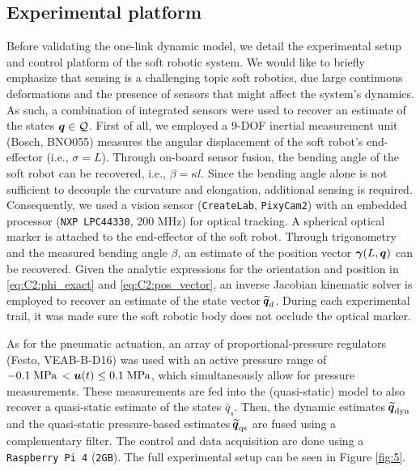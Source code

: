 \subsection{Experimental platform}
\noindent Before validating the one-link dynamic model, we detail the experimental setup and control platform of the soft robotic system. We would like to briefly emphasize that sensing is a challenging topic soft robotics, due large continuous deformations and the presence of sensors that might affect the system's dynamics. As such, a combination of integrated sensors were used to recover an estimate of the states ${\boldsymbol{q}} \in \mathcal{Q}$. First of all, we employed a 9-DOF inertial measurement unit (Bosch, BNO055) measures the angular displacement of the soft robot's end-effector (i.e., $\sigma = L$). Through on-board sensor fusion, the bending angle of the soft robot can be recovered, i.e., $\beta = \kappa l$. Since the bending angle alone is not sufficient to decouple the curvature and elongation, additional sensing is required. Consequently, we used a vision sensor (\texttt{CreateLab}, \texttt{PixyCam2}) with an embedded processor (\texttt{NXP LPC44330}, 200 MHz) for optical tracking. A spherical optical marker is attached to the end-effector of the soft robot. Through trigonometry and the measured bending angle $\beta$, an estimate of the position vector ${\boldsymbol{\gamma}}(L,{\boldsymbol{q}})$ can be recovered. Given the analytic expressions for the orientation and position in \eqref{eq:C2:phi_exact} and \eqref{eq:C2:pos_vector}, an inverse Jacobian kinematic solver is employed to recover an estimate of the state vector $\widetilde{\!\boldsymbol{q}}_d$.
During each experimental trail, it was made sure the soft robotic body does not occlude the optical marker.

As for the pneumatic actuation, an array of proportional-pressure regulators (Festo, VEAB-B-D16) was used with an active pressure range of $-0.1 \;\text{MPa}\, < {\boldsymbol{u}}(t) \le 0.1 \; \textrm{MPa}$, which simultaneously allow for pressure measurements. These measurements are fed into the (quasi-static) model to also recover a quasi-static estimate of the states $\hat{q}_s$. Then, the dynamic estimates $\widetilde{\!\boldsymbol{q}}_{\textrm{dyn}}$ and the quasi-static pressure-based estimates $\widetilde{\!\boldsymbol{q}}_{\textrm{qs}}$ are fused using a complementary filter. The control and data acquisition are done using a \texttt{Raspberry Pi 4} (\texttt{2GB}). The full experimental setup can be seen in Figure \ref{fig:5}.


